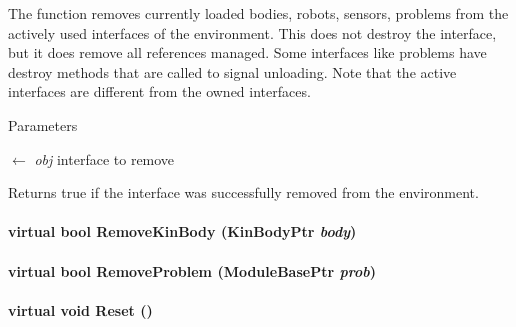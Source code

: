 The function removes currently loaded bodies, robots, sensors, problems from the actively used interfaces of the environment. This does not destroy the interface, but it does remove all references managed. Some interfaces like problems have destroy methods that are called to signal unloading. Note that the active interfaces are different from the owned interfaces. 
\begin{DoxyParams}{Parameters}
\item[\mbox{$\leftarrow$} {\em obj}]interface to remove \end{DoxyParams}
\begin{DoxyReturn}{Returns}
true if the interface was successfully removed from the environment. 
\end{DoxyReturn}
\hypertarget{classOpenRAVE_1_1EnvironmentBase_a00f7d94b59a27465a1153c064b25903e}{
\paragraph[{RemoveKinBody}]{\setlength{\rightskip}{0pt plus 5cm}virtual bool RemoveKinBody (KinBodyPtr {\em body})}\hfill}
\label{classOpenRAVE_1_1EnvironmentBase_a00f7d94b59a27465a1153c064b25903e}
\hypertarget{classOpenRAVE_1_1EnvironmentBase_a3d0482313a9ef3be17b91495f2fa9043}{
\paragraph[{RemoveProblem}]{\setlength{\rightskip}{0pt plus 5cm}virtual bool RemoveProblem (ModuleBasePtr {\em prob})}\hfill}
\label{classOpenRAVE_1_1EnvironmentBase_a3d0482313a9ef3be17b91495f2fa9043}
\hypertarget{classOpenRAVE_1_1EnvironmentBase_a43a787400d2a563b9eee1a149225c18a}{
\paragraph[{Reset}]{\setlength{\rightskip}{0pt plus 5cm}virtual void Reset ()}\hfill}
\label{classOpenRAVE_1_1EnvironmentBase_a43a787400d2a563b9eee1a149225c18a}



